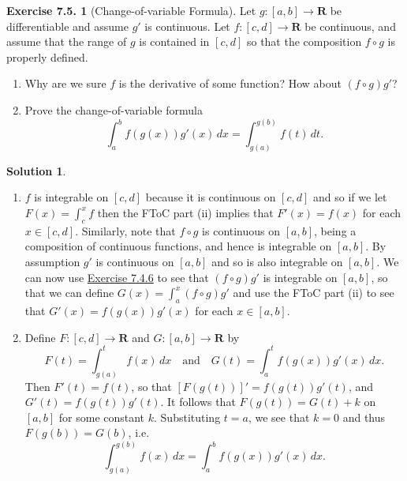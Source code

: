 \documentclass[12pt]{article}
\theoremstyle{definition}
\theoremstyle{exercise}
\newtheorem{exercise}{Exercise 7.5.}
\theoremstyle{solution}
\newtheorem*{solution}{Solution}
\newcommand{\quand}{\quad \text{and} \quad}
\newcommand{\R}{\mathbf{R}}
\begin{document}
\begin{exercise}[Change-of-variable Formula]
\label{ex:10}
    Let \( g : [a, b] \to \R \) be differentiable and assume \( g' \) is continuous. Let \( f : [c, d] \to \R \) be continuous, and assume that the range of \( g \) is contained in \( [c, d] \) so that the composition \( f \circ g \) is properly defined.
    \begin{enumerate}
        \item Why are we sure \( f \) is the derivative of some function? How about \( (f \circ g) g' \)?

        \item Prove the change-of-variable formula
        \[
            \int_a^b f(g(x)) g'(x) \, dx = \int_{g(a)}^{g(b)} f(t) \, dt.
        \]
    \end{enumerate}
\end{exercise}

\begin{solution}
    \begin{enumerate}
        \item \( f \) is integrable on \( [c, d] \) because it is continuous on \( [c, d] \) and so if we let \( F(x) = \int_c^x f \) then the FToC part (ii) implies that \( F'(x) = f(x) \) for each \( x \in [c, d] \). Similarly, note that \( f \circ g \) is continuous on \( [a, b] \), being a composition of continuous functions, and hence is integrable on \( [a, b] \). By assumption \( g' \) is continuous on \( [a, b] \) and so is also integrable on \( [a, b] \). We can now use \href{https://lew98.github.io/Mathematics/UA_Section_7_4_Exercises.pdf}{Exercise 7.4.6} to see that \( (f \circ g) g' \) is integrable on \( [a, b] \), so that we can define \( G(x) = \int_a^x (f \circ g) g' \) and use the FToC part (ii) to see that \( G'(x) = f(g(x)) g'(x) \) for each \( x \in [a, b] \).

        \item Define \( F : [c, d] \to \R \) and \( G : [a, b] \to \R \) by
        \[
            F(t) = \int_{g(a)}^t f(x) \, dx \quand G(t) = \int_a^t f(g(x)) g'(x) \, dx.
        \]
        Then \( F'(t) = f(t) \), so that \( [F(g(t))]' = f(g(t)) g'(t) \), and \( G'(t) = f(g(t)) g'(t) \). It follows that \( F(g(t)) = G(t) + k \) on \( [a, b] \) for some constant \( k \). Substituting \( t = a \), we see that \( k = 0 \) and thus \( F(g(b)) = G(b) \), i.e.\
        \[
            \int_{g(a)}^{g(b)} f(x) \, dx = \int_a^b f(g(x)) g'(x) \, dx.
        \]
    \end{enumerate}
\end{solution}
\end{document}
